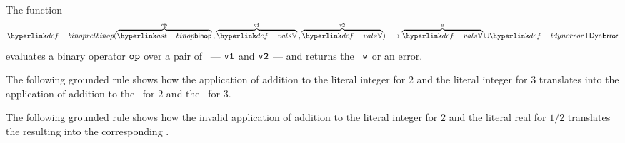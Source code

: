 \FormallyParagraph
\begin{mathpar}
\end{mathpar}

\begin{mathpar}
\end{mathpar}

\begin{mathpar}
\end{mathpar}

\hypertarget{def-binoprel}{}
The function
\[
  \binoprel(\overname{\binop}{\op} \aslsep \overname{\vals}{\vvone} \aslsep \overname{\vals}{\vvtwo})
  \aslto \overname{\vals}{\vw} \cup \TDynError
\]
evaluates a binary operator $\op$ over a pair of \nativevalues\  --- $\vvone$ and $\vvtwo$ --- and returns the
\nativevalue\  $\vw$ or an error.

The following grounded rule shows how the application of addition
to the literal integer for $2$ and the literal integer for $3$
translates into the application of addition to the \nativevalue\ for $2$
and the \nativevalue\ for $3$.
\begin{mathpar}
\end{mathpar}

The following grounded rule shows how the invalid application of addition
to the literal integer for $2$ and the literal real for $1/2$
translates the resulting \typingerrorterm{} into the corresponding \dynamicerrorterm{}.
\begin{mathpar}
\end{mathpar}

